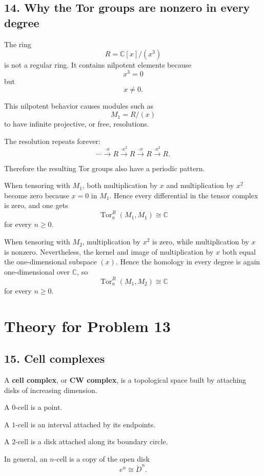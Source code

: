 \documentclass[12pt,a4paper]{article}
\theoremstyle{notespace}
\begin{document}
\subsection*{14. Why the Tor groups are nonzero in every degree}

The ring
\[
R=\mathbb C[x]/(x^3)
\]
is not a regular ring. It contains nilpotent elements because
\[
x^3=0
\]
but
\[
x\neq 0.
\]

This nilpotent behavior causes modules such as
\[
M_1=R/(x)
\]
to have infinite projective, or free, resolutions.

The resolution repeats forever:
\[
\cdots
\xrightarrow{\cdot x}
R
\xrightarrow{\cdot x^2}
R
\xrightarrow{\cdot x}
R
\xrightarrow{\cdot x^2}
R.
\]

Therefore the resulting Tor groups also have a periodic pattern.

When tensoring with \(M_1\), both multiplication by \(x\) and multiplication by \(x^2\) become zero because \(x=0\) in \(M_1\). Hence every differential in the tensor complex is zero, and one gets
\[
\operatorname{Tor}_n^R(M_1,M_1)\cong \mathbb C
\]
for every \(n\geq 0\).

When tensoring with \(M_2\), multiplication by \(x^2\) is zero, while multiplication by \(x\) is nonzero. Nevertheless, the kernel and image of multiplication by \(x\) both equal the one-dimensional subspace \((x)\). Hence the homology in every degree is again one-dimensional over \(\mathbb C\), so
\[
\operatorname{Tor}_n^R(M_1,M_2)\cong \mathbb C
\]
for every \(n\geq 0\).

\section{Theory for Problem 13}

\subsection*{15. Cell complexes}

A \textbf{cell complex}, or \textbf{CW complex}, is a topological space built by attaching disks of increasing dimension.

A \(0\)-cell is a point.

A \(1\)-cell is an interval attached by its endpoints.

A \(2\)-cell is a disk attached along its boundary circle.

In general, an \(n\)-cell is a copy of the open disk
\[
e^n\cong \mathring D^n.
\]
\end{document}
